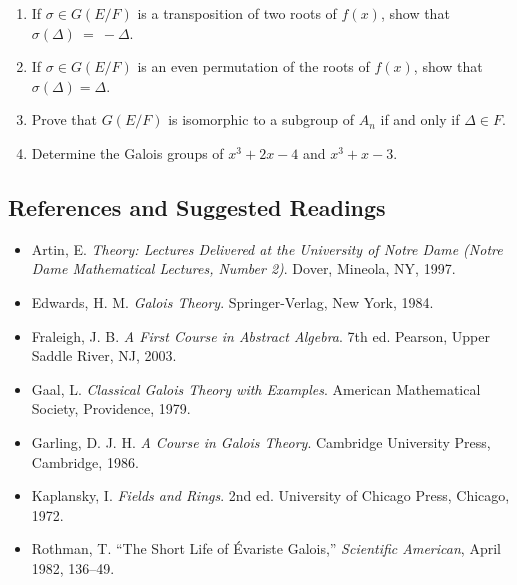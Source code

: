 {\begin{enumerate}
\begin{enumerate}
 \item
If $\sigma \in G(E/F)$ is a transposition of two roots of $f(x)$, show
that $\sigma( \Delta )~=~-\Delta$.
 
  \item
If $\sigma \in G(E/F)$ is an even permutation of the roots of $f(x)$, show
that $\sigma( \Delta ) = \Delta$.
 
  \item
Prove that $G(E/F)$ is isomorphic to a subgroup of $A_n$ if and
only if $\Delta \in F$.
 
 \item
Determine the Galois groups of $x^3 + 2 x - 4$ and $x^3 + x -3$.
 
\end{enumerate}
 
 
\end{enumerate}
}
 
 
 
 
\subsection*{References and Suggested Readings}
 
{\small
\begin{itemize}
 
\item[{\bf [1]}] %
Artin, E. {\it Theory: Lectures Delivered at the University of Notre Dame (Notre Dame Mathematical Lectures, Number 2)}. 
Dover, Mineola, NY, 1997.
 
\item[{\bf [2]}]
Edwards, H. M. {\it Galois Theory}. Springer-Verlag, New
York, 1984.
 
\item[{\bf [3]}] %
Fraleigh, J. B. 
{\it A First Course in Abstract Algebra}. 7th ed.
Pearson, Upper Saddle River, NJ, 2003. 
 
\item[{\bf [4]}] %
Gaal, L. {\it Classical Galois Theory with Examples}. 
American Mathematical Society, Providence, 1979. 
 
\item[{\bf [5]}]
Garling, D. J. H. {\it A Course in Galois Theory}.
Cambridge University Press, Cambridge, 1986.
 
 
\item[{\bf [6]}] %
Kaplansky, I. {\it Fields and Rings}. 2nd ed. University of Chicago
Press, Chicago, 1972. 
 
\item[{\bf [7]}]
Rothman, T. ``The Short Life of \'{E}variste Galois,'' {\it
Scientific American}, April 1982, 136--49.
 
\end{itemize}
}
 
\sagesection
 

